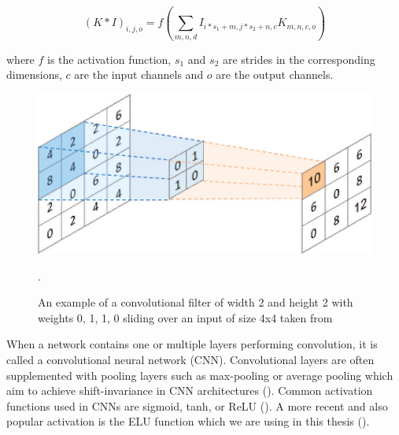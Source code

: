 \begin{equation}
    (K * I)_{i,j,o} = f(\sum_{m,n,d} I_{i*s_1+m,j*s_2+n,c} K_{m,n,c,o})
    \label{eq:convolution}
\end{equation}

where $f$ is the activation function, $s_1$ and $s_2$ are strides in the corresponding dimensions, $c$ are the input channels and $o$ are the output channels.

\begin{figure}[!htpb]
\centering
   \includegraphics[width=0.8\linewidth]{img/ch2/convolution}
   \caption[Convolutional filter]{An example of a convolutional filter of width 2 and height 2 with weights 0, 1, 1, 0 sliding over an input of size 4x4 taken from~\cite{conv-diagram}}.
\label{fig:convolution}
\end{figure}

When a network contains one or multiple layers performing convolution, it is called a convolutional neural network (CNN).
Convolutional layers are often supplemented with pooling layers such as max-pooling or average pooling which aim to achieve shift-invariance in CNN architectures (\cite{cnn-description}). 
Common activation functions used in CNNs are sigmoid, tanh, or ReLU (\cite{relu-paper}).
A more recent and also popular activation is the ELU function which we are using in this thesis (\cite{clevert-elu-2016}). 

